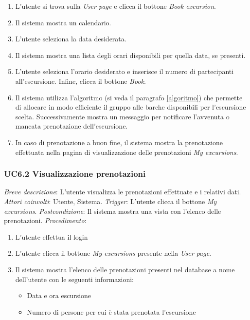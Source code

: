 \begin{enumerate}
    \item L'utente si trova sulla \textit{User page} e clicca il bottone \textit{Book excursion}.
    \item Il sistema mostra un calendario.
    \item L'utente seleziona la data desiderata.
    \item Il sistema mostra una lista degli orari disponibili per quella data, se presenti.
    \item L'utente seleziona l'orario desiderato e inserisce il numero di partecipanti all'escursione. Infine, clicca il bottone \textit{Book}.
    \item Il sistema utilizza l'algoritmo (si veda il paragrafo \ref{algoritmo}) che permette di allocare in modo efficiente il gruppo alle barche disponibili per l'escursione scelta. Successivamente mostra un messaggio per notificare l'avvenuta o mancata prenotazione dell'escursione.
    \item In caso di prenotazione a buon fine, il sistema mostra la prenotazione effettuata nella pagina di visualizzazione delle prenotazioni \textit{My excursions}.
\end{enumerate}

\subsubsection{UC6.2 Visualizzazione prenotazioni}
 \emph{Breve descrizione}: L'utente visualizza le prenotazioni effettuate e i relativi dati.\medbreak
 \emph{Attori coinvolti}: Utente, Sistema.\medbreak
 \emph{Trigger}: L'utente clicca il bottone \textit{My excursions}. \medbreak
 \emph{Postcondizione}: Il sistema mostra una vista con l'elenco delle prenotazioni.\medbreak
 \emph{Procedimento}:

\begin{enumerate}
    \item L'utente effettua il login
    \item L'utente clicca il bottone \textit{My excursions} presente nella \textit{User page}.
    \item Il sistema mostra l'elenco delle prenotazioni presenti nel database a nome dell'utente con le seguenti informazioni:
    \begin{itemize}
        \item Data e ora escursione
        \item Numero di persone per cui è stata prenotata l'escursione
    \end{itemize}
\end{enumerate}

